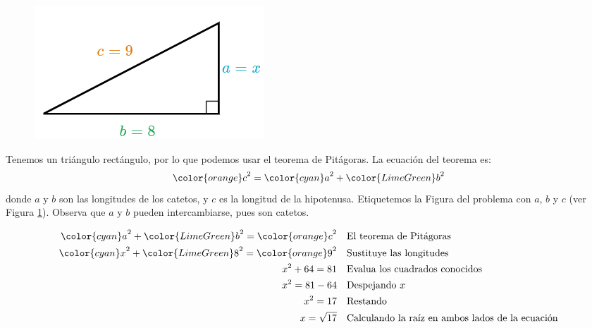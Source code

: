 \begin{minipage}[t][][t]{0.6\textwidth}
    \begin{solutionbox}{9.5cm}
        \begin{minipage}{0.4\textwidth}
            \begin{figure}[H]
                \centering
                \includegraphics[width=0.9\linewidth]{../images/lados_pitagoras_34a.png}
                \caption{}
                \label{fig:lados_pitagoras_34a}
            \end{figure}
        \end{minipage}\hfill
        \begin{minipage}{0.55\textwidth}
            Tenemos un triángulo rectángulo, por lo que podemos usar el teorema de Pitágoras.
            La ecuación del teorema es:
            \[{\color{orange}c}^2={\color{cyan}a}^2+{\color{LimeGreen}b}^2\]
            donde $a$ y $b$ son las longitudes de los catetos, y $c$ es la longitud de la hipotenusa.
            Etiquetemos la Figura del problema con $a$, $b$ y $c$ (ver Figura \ref{fig:lados_pitagoras_34a}).
            Observa que $a$ y $b$ pueden intercambiarse, pues son catetos.
        \end{minipage}
        \begin{align*}
            {\color{cyan}a}^2+{\color{LimeGreen}b}^2  ={\color{orange}c}^2 & \text{\quad El teorema de Pitágoras}                          \\
            {\color{cyan}x}^2+{\color{LimeGreen}8}^2  ={\color{orange}9}^2 & \text{\quad Sustituye las longitudes}                         \\
            x^2+64   =81                                                   & \text{\quad Evalua los cuadrados conocidos}                   \\
            x^2=81-64                                                      & \text{\quad Despejando } x                                    \\
            x^2=17                                                         & \text{\quad Restando}                                         \\
            x=\sqrt{17}                                                    & \text{\quad Calculando la raíz en ambos lados de la ecuación} \\
        \end{align*}
    \end{solutionbox}
\end{minipage}
